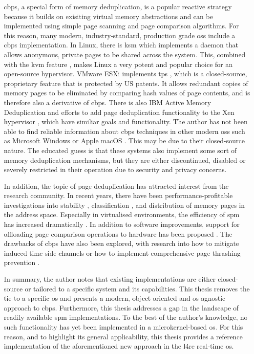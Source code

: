 \Ac{cbps}, a special form of memory deduplication, is a popular reactive strategy because it builds on exisiting virtual memory abstractions and can be implemented using simple page scanning and page comparison algorithms.
For this reason, many modern, industry-standard, production grade \acp{os} include a \ac{cbps} implementation.
In Linux, there is \ac{ksm} \cite{ksm} which implements a daemon that allows anonymous, private pages to be shared across the system.
This, combined with the \ac{kvm} feature \cite{kvm}, makes Linux a very potent and popular choice for an open-source hypervisor.
VMware ESXi implements \ac{tps} \cite{vmware-tps2021}, which is a closed-source, proprietary feature that is protected by US patents.
It allows redundant copies of memory pages to be eliminated by comparing hash values of page contents, and is therefore also a derivative of \ac{cbps}.
There is also IBM Active Memory Deduplication \cite{ibm-amd2012} and efforts to add page deduplication functionality to the Xen hypervisor \cite{vmdedup2014}, which have similiar goals and functionality.
The author has not been able to find reliable information about \ac{cbps} techniques in other modern \acp{os} such as Microsoft Windows \cite{microsoft-windows} or Apple macOS \cite{apple-macos}.
This may be due to their closed-source nature.
The educated guess is that these systems also implement some sort of memory deduplication mechanisms, but they are either discontinued, disabled or severely restricted in their operation due to security and privacy concerns.

In addition, the topic of page deduplication has attracted interest from the research community.
In recent years, there have been performance-profitable investigations into stability \cite{spm-page-stability2016, spm-page-stability2017}, classification \cite{spm-classification2014}, and distribution \cite{spm-distribution2019} of memory pages in the address space.
Especially in virtualised environments, the efficiency of \ac{spm} has increased dramatically \cite{spm-virtualisation2012}.
In addition to software improvements, support for offloading page comparison operations to hardware has been proposed \cite{spm-hardware2019}.
The drawbacks of \ac{cbps} have also been explored, with research into how to mitigate induced time side-channels \cite{spm-side-channels2018} or how to implement comprehensive page thrashing prevention \cite{spm-thrashing2016}.

In summary, the author notes that existing implementations are either closed-source or tailored to a specific system and its capabilities.
This thesis removes the tie to a specific \ac{os} and presents a modern, object oriented and \ac{os}-agnostic approach to \ac{cbps}.
Furthermore, this thesis addresses a gap in the landscape of readily available \ac{spm} implementations.
To the best of the author's knowledge, no such functionality has yet been implemented in a microkernel-based \ac{os}.
For this reason, and to highlight its general applicability, this thesis provides a reference implementation of the aforementioned new approach in the \ac{l4re} real-time \ac{os}.

